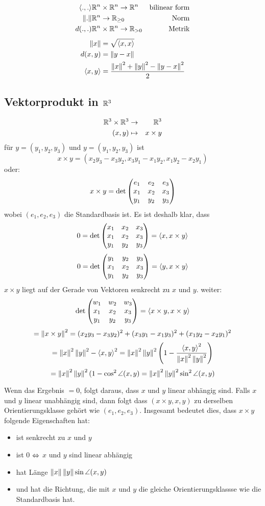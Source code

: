 \begin{Faz}
  \begin{align*}
    \left\langle .,. \right\rangle& \mathbb{R}^n\times\mathbb{R}^n\to\mathbb{R}^n&\text{bilinear form}\\
    \left\| . \right\|& \mathbb{R}^n\to \mathbb{R}_{\geq 0}& \text{Norm}\\
    d(.,.)&\mathbb{R}^n\times\mathbb{R}^n\to\mathbb{R}_{>0}&\text{Metrik}
  \end{align*}
  \begin{align*}
    \left\| x \right\|&=\sqrt{\left\langle x,x \right\rangle}\\
    d(x,y)&=\left\| y-x \right\|\\
    \left\langle x,y \right\rangle&=\frac{\left\| x \right\|^2+\left\| y \right\|^2-\left\| y-x \right\|^2}{2}
  \end{align*}
\end{Faz}
\subsection{Vektorprodukt in $\mathbb{R}^3$}
  \begin{align*}
    \mathbb{R}^3\times\mathbb{R}^3&\to&\mathbb{R}^3\\
    (x,y)&\mapsto&x\times y
  \end{align*}
  für $y=(y_1,y_2,y_3)$ und $y=(y_1,y_2,y_3)$ ist 
  \[x\times y=(x_2y_3-x_3y_2, x_3y_1-x_1y_2,x_1y_2-x_2y_1)\]
  oder:
  \[x\times y=\det\begin{pmatrix}e_1&e_2&e_3\\x_1&x_2&x_3\\y_1&y_2&y_3\end{pmatrix}\]
  wobei $(e_1,e_2,e_3)$ die Standardbasis ist. Es ist deshalb klar, dass
  \[0=\det\begin{pmatrix}x_1&x_2&x_3\\x_1&x_2&x_3\\y_1&y_2&y_3\end{pmatrix}=\left\langle x,x\times y \right\rangle\]
  \[0=\det\begin{pmatrix}y_1&y_2&y_3\\x_1&x_2&x_3\\y_1&y_2&y_3\end{pmatrix}=\left\langle y,x\times y \right\rangle\]
  $x\times y$ liegt auf der Gerade von Vektoren senkrecht zu $x$ und $y$.
  weiter:
  \[\det\begin{pmatrix}w_1&w_2&w_3\\x_1&x_2&x_3\\y_1&y_2&y_3\end{pmatrix}=\left\langle x\times y,x\times y \right\rangle\]
  \[=\left\| x\times y \right\|^2=(x_2y_3-x_3y_2)^2+(x_3y_1-x_1y_3)^2+(x_1y_2-x_2y_1)^2\]
  \[=\left\| x \right\|^2\left\| y \right\|^2-\left\langle x,y \right\rangle^2=\left\| x \right\|^2\left\| y \right\|^2\left( 1-\frac{\left\langle x,y \right\rangle^2}{\left\| x \right\|^2\left\| y \right\|^2} \right)\]
  \[=\left\| x \right\|^2\left\| y \right\|^2(1-\cos^2\angle (x,y) = \left\| x \right\|^2\left\| y \right\|^2\sin^2\angle (x,y)\]
\begin{Faz}
  Wenn das Ergebnis $=0$, folgt daraus, dass $x$ und $y$ linear abhängig sind. Falls $x$ und $y$ linear unabhängig sind, dann folgt dass $(x\times y,x,y)$ zu derselben Orientierungsklasse gehört wie $(e_1,e_2,e_3)$. Insgesamt bedeutet dies, dass $x\times y$ folgende Eigenschaften hat:
  \begin{itemize}
    \item ist senkrecht zu $x$ und $y$
    \item ist 0 $\Leftrightarrow$ $x$ und $y$ sind linear abhängig
    \item hat Länge $\left\| x \right\|\left\| y \right\|\sin \angle (x,y)$
    \item und hat die Richtung, die mit $x$ und $y$ die gleiche Orientierungsklassse wie die Standardbasis hat.
  \end{itemize}
\end{Faz}
